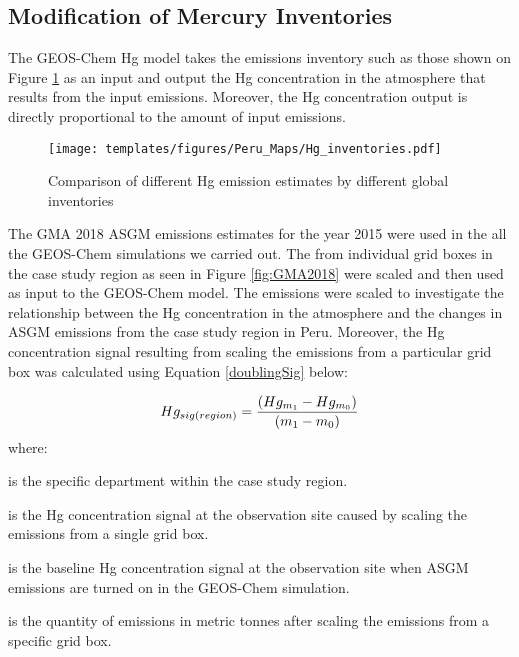 \subsection{Modification of Mercury Inventories}
\begin{flushleft}
The GEOS-Chem Hg model takes the emissions inventory such as those shown on Figure \ref{fig:Hg_inventories} as an input and output the Hg concentration in the atmosphere that results from the input emissions. Moreover, the Hg concentration output is directly proportional to the amount of input emissions. 
\end{flushleft}
\begin{figure}[H]
  \texttt{[image: templates/figures/Peru\_Maps/Hg\_inventories.pdf]}
  \centering
  \caption{Comparison of different Hg emission estimates by different global inventories}
  \label{fig:Hg_inventories}
  
\end{figure}
\FloatBarrier
\begin{flushleft}
The GMA 2018 ASGM emissions estimates for the year 2015 were used in the all the GEOS-Chem simulations we carried out. The  from individual grid boxes in the case study region as seen in Figure \ref{fig:GMA2018} were scaled and then used as input to the GEOS-Chem model. The emissions were scaled to investigate the relationship between the Hg concentration in the atmosphere and the changes in ASGM emissions from the case study region in Peru. Moreover, the Hg concentration signal resulting from scaling the emissions from a particular grid box was calculated using Equation \ref{doublingSig} below:
\end{flushleft}

\begin{flushleft}
\begin{equation}
\label{doublingSig}
Hg_{sig(region)}=\small\frac{(Hg_{m_1} -Hg_{m_0})}{(m_1 -m_0)}
\end{equation}
where:
\end{flushleft}

\begin{description}[leftmargin=!,labelwidth={3 em}]
    \item [$region$] is the specific department within the case study region.
    \item [$Hg_{m_1}$] is the Hg concentration signal at the observation site caused by scaling the emissions from a single grid box. 
    \item [$Hg_{m_0}$] is the baseline Hg concentration signal at the observation site when ASGM emissions are turned on in the GEOS-Chem simulation.
    \item [$m_1$] is the quantity of emissions in metric tonnes after scaling the emissions from a specific grid box.
\end{description}


